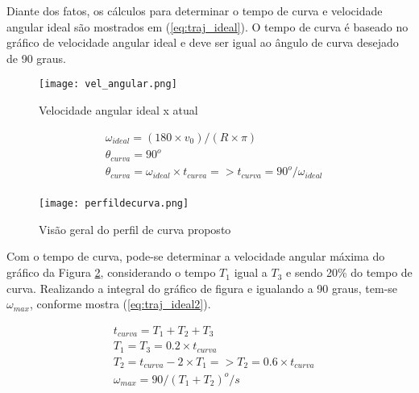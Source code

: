 Diante dos fatos, os cálculos para determinar o tempo de curva e velocidade angular ideal são mostrados em (\ref{eq:traj_ideal}). O tempo de curva é baseado no gráfico de velocidade angular ideal e deve ser igual ao ângulo de curva desejado de 90 graus.

\begin{figure}[!htb]
	\caption{\label{fig:curvasperfil_1}Velocidade angular ideal x atual}
	\begin{center}
		\texttt{[image: vel\_angular.png]}
	\end{center}
\end{figure} 


\begin{equation}
\label{eq:traj_ideal}
	\begin{split}
	&\omega_{ideal} = (180 \times v_0)/(R \times \pi)\\
	&\theta_{curva} = 90^o\\
	&\theta_{curva} = \omega_{ideal} \times t_{curva} => t_{curva} = 90^o/\omega_{ideal}\\
	\end{split}
\end{equation}


\begin{figure}[!htb]
	\caption{\label{fig:curvasperfil_2}Visão geral do perfil de curva proposto}
	\begin{center}
		\texttt{[image: perfildecurva.png]}
	\end{center}
\end{figure} 

Com o tempo de curva, pode-se determinar a velocidade angular máxima do gráfico da Figura \ref{fig:curvasperfil_2}, considerando o tempo $T_1$ igual a $T_3$ e sendo 20\% do tempo de curva. Realizando a integral do gráfico de figura e igualando a 90 graus, tem-se $\omega_{max}$, conforme mostra (\ref{eq:traj_ideal2}).

\begin{equation}
\label{eq:traj_ideal2}
	\begin{split}
	&t_{curva} = T_1 + T_2 + T_3\\
	&T_1 = T_3 = 0.2 \times t_{curva}\\
	&T_2 = t_{curva} - 2 \times T_1 => T_2 = 0.6 \times t_{curva}\\
	&\omega_{max} = 90/(T_1 + T_2) ^o/s\\
	\end{split}
\end{equation}


